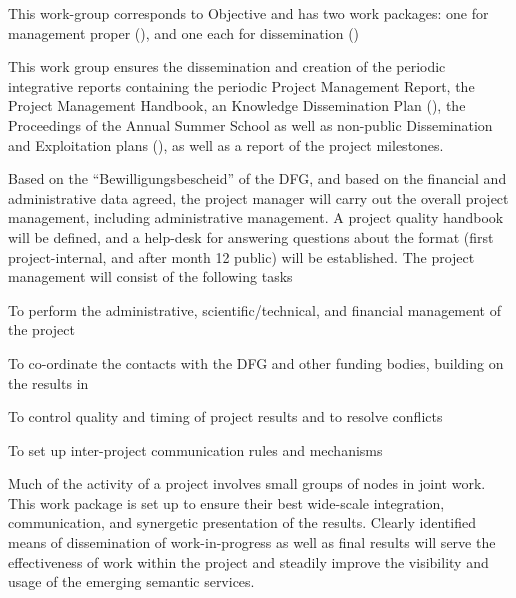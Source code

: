 \begin{workplan}
\begin{workarea}[id=mansubsus,title={Management, Support \& Sustainability}, short=Management]
  This work-group corresponds to Objective  and has two work packages:
  one for management proper ({}), and one each for
  dissemination ({})
   
  This work group ensures the dissemination and creation of the periodic integrative
  reports containing the periodic Project Management Report, the Project Management
  Handbook, an Knowledge Dissemination Plan ({}), the Proceedings of the
  Annual {\pn} Summer School as well as non-public Dissemination and Exploitation plans
  ({}), as well as a report of the {\pn} project milestones.
   
\begin{workpackage}[id=management,lead=jacu,
  title=Project Management,
 jacuRM=2,jacuRAM=8,pcgRM=2]
  Based on the ``Bewilligungsbescheid'' of the DFG, and based on the financial and
  administrative data agreed, the project manager will carry out the overall project
  management, including administrative management.  A project quality handbook will be
  defined, and a {\pn} help-desk for answering questions about the format (first
  project-internal, and after month 12 public) will be established. The project management
  will consist of the following tasks
\begin{tasklist} 
\begin{task}[id=foo,wphases=0-3,requires=\taskin{t1}{dissem}]
  To perform the administrative, scientific/technical, and financial management of the
  project 
\end{task}
\begin{task}[wphases=13-17!.5]
  To co-ordinate the contacts with the DFG and other funding bodies, building on the
  results in 
\end{task}
\begin{task}
  To control quality and timing of project results and to resolve conflicts
\end{task}
\begin{task}
  To set up inter-project communication rules and mechanisms
\end{task}
\end{tasklist}

\end{workpackage}
 
\begin{workpackage}[id=dissem,lead=pcg,
 title=Dissemination and Exploitation,
pcgRM=8,jacuRAM=2] 
Much of the activity of a project involves small groups of nodes in joint work. This work
 package is set up to ensure their best wide-scale integration, communication, and
 synergetic presentation of the results. Clearly identified means of dissemination of
 work-in-progress as well as final results will serve the effectiveness of work within the
 project and steadily improve the visibility and usage of the emerging semantic services.



\end{workpackage}
\end{workarea}
\end{workplan}

